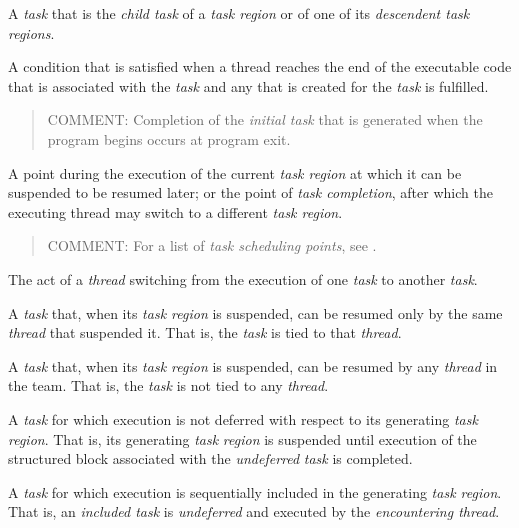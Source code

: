 \glossarydefstart
A \emph{task} that is the \emph{child task} of a \emph{task region} or 
of one of its \emph{descendent task regions}.
\glossarydefend

\glossarydefstart
A condition that is satisfied when a thread reaches the end of the executable
code that is associated with the \emph{task} and any
 that is created for the \emph{task} is fulfilled.

\begin{quote}
COMMENT: Completion of the \emph{initial task} that is generated when the 
program begins occurs at program exit.
\end{quote}
\glossarydefend

\glossarydefstart
A point during the execution of the current \emph{task region} at which it 
can be suspended to be resumed later; or the point of \emph{task completion}, 
after which the executing thread may switch to a different \emph{task region}.

\begin{quote}
COMMENT: For a list of \emph{task scheduling points}, see 
.
\end{quote}
\glossarydefend

\glossarydefstart
The act of a \emph{thread} switching from the execution of one \emph{task} 
to another \emph{task}.
\glossarydefend

\glossarydefstart
A \emph{task} that, when its \emph{task region} is suspended, can be resumed 
only by the same \emph{thread} that suspended it. That is, the \emph{task} 
is tied to that \emph{thread}.
\glossarydefend

\glossarydefstart
A \emph{task} that, when its \emph{task region} is suspended, can be resumed 
by any \emph{thread} in the team. That is, the \emph{task} is not tied to 
any \emph{thread}.
\glossarydefend

\glossarydefstart
A \emph{task} for which execution is not deferred with respect to its 
generating \emph{task} \emph{region}. That is, its generating \emph{task}
\emph{region} is suspended until execution of the structured block associated 
with the \emph{undeferred} \emph{task} is completed.
\glossarydefend

\glossarydefstart
A \emph{task} for which execution is sequentially included in the 
generating \emph{task region}. That is, an \emph{included task} is 
\emph{undeferred} and executed by the \emph{encountering thread}.
\glossarydefend

